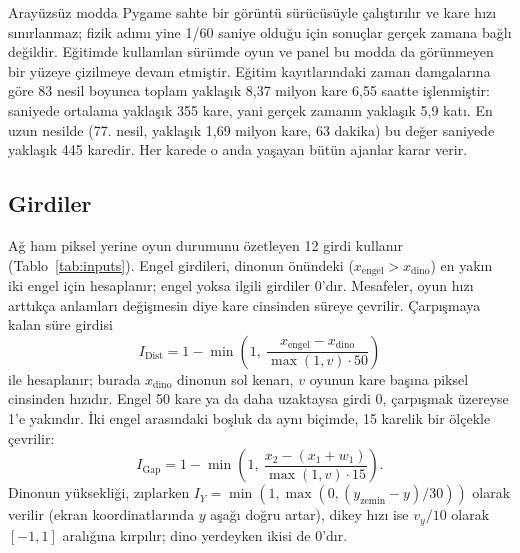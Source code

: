 \documentclass[11pt,a4paper]{article}
\begin{document}
Arayüzsüz modda Pygame sahte bir görüntü sürücüsüyle çalıştırılır ve kare hızı sınırlanmaz; fizik adımı yine 1/60 saniye olduğu için sonuçlar gerçek zamana bağlı değildir. Eğitimde kullanılan sürümde oyun ve panel bu modda da görünmeyen bir yüzeye çizilmeye devam etmiştir. Eğitim kayıtlarındaki zaman damgalarına göre 83 nesil boyunca toplam yaklaşık 8,37 milyon kare 6,55 saatte işlenmiştir: saniyede ortalama yaklaşık 355 kare, yani gerçek zamanın yaklaşık 5,9 katı. En uzun nesilde (77. nesil, yaklaşık 1,69 milyon kare, 63 dakika) bu değer saniyede yaklaşık 445 karedir. Her karede o anda yaşayan bütün ajanlar karar verir.

\subsection{Girdiler}

Ağ ham piksel yerine oyun durumunu özetleyen 12 girdi kullanır (Tablo~\ref{tab:inputs}). Engel girdileri, dinonun önündeki ($x_{\mathrm{engel}} > x_{\mathrm{dino}}$) en yakın iki engel için hesaplanır; engel yoksa ilgili girdiler 0'dır. Mesafeler, oyun hızı arttıkça anlamları değişmesin diye kare cinsinden süreye çevrilir. Çarpışmaya kalan süre girdisi
\begin{equation}
  I_{\mathrm{Dist}} = 1 - \min\!\left(1,\ \frac{x_{\mathrm{engel}} - x_{\mathrm{dino}}}{\max(1, v)\cdot 50}\right)
  \label{eq:tti}
\end{equation}
ile hesaplanır; burada $x_{\mathrm{dino}}$ dinonun sol kenarı, $v$ oyunun kare başına piksel cinsinden hızıdır. Engel 50 kare ya da daha uzaktaysa girdi 0, çarpışmak üzereyse 1'e yakındır. İki engel arasındaki boşluk da aynı biçimde, 15 karelik bir ölçekle çevrilir:
\begin{equation}
  I_{\mathrm{Gap}} = 1 - \min\!\left(1,\ \frac{x_{2} - (x_{1} + w_{1})}{\max(1, v)\cdot 15}\right).
  \label{eq:gap}
\end{equation}
Dinonun yüksekliği, zıplarken $I_{Y} = \min\!\left(1, \max\!\left(0, (y_{\mathrm{zemin}} - y)/30\right)\right)$ olarak verilir (ekran koordinatlarında $y$ aşağı doğru artar), dikey hızı ise $v_y/10$ olarak $[-1, 1]$ aralığına kırpılır; dino yerdeyken ikisi de 0'dır.
\end{document}
